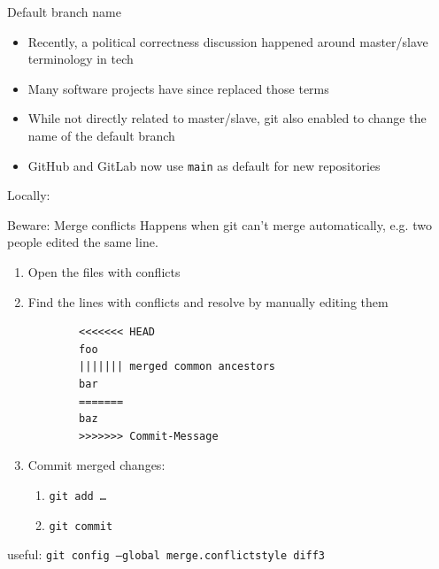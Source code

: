 \begin{frame}[c, fragile]{Default branch name}

  \begin{itemize}
    \item Recently, a political correctness discussion happened around  master/slave terminology in tech
    \item Many software projects have since replaced those terms
    \item While not directly related to master/slave, git also enabled to change the name of the default branch
    \item GitHub and GitLab now use \texttt{main} as default for new repositories
  \end{itemize}

  Locally:
\end{frame}

\begin{frame}[fragile]{Beware: Merge conflicts}
  Happens when git can't merge automatically, e.g. two people edited the same line.

  \begin{enumerate}
    \item Open the files with conflicts
    \item Find the lines with conflicts and resolve by manually editing them
      \begin{verbatim}
        <<<<<<< HEAD
        foo
        ||||||| merged common ancestors
        bar
        =======
        baz
        >>>>>>> Commit-Message
\end{verbatim}
    \item Commit merged changes:
      \begin{enumerate}
        \item \texttt{git add …}
        \item \texttt{git commit}
      \end{enumerate}
  \end{enumerate}
  useful: \texttt{git config --global merge.conflictstyle diff3}
\end{frame}


